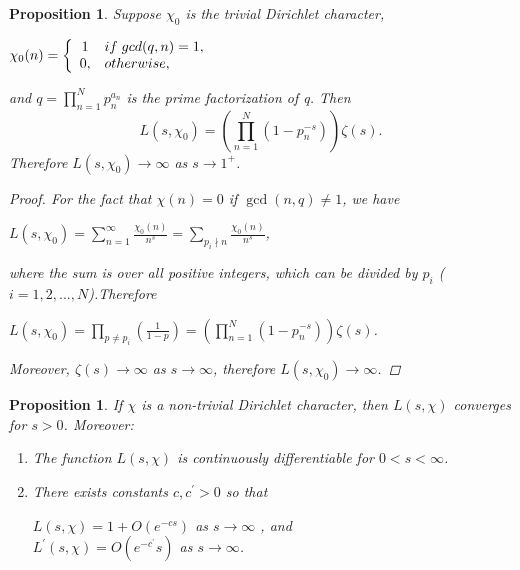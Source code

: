 \documentclass[psamsfonts]{amsart}
\newtheorem{prop}[thm]{Proposition}
\theoremstyle{definition}
\theoremstyle{remark}
\numberwithin{equation}{section}
\begin{document}
			\begin{prop}
				Suppose $\chi_0$ is the trivial Dirichlet character,
				\begin{center}
			$\chi_0(n)=\left\{\begin{array}{cl}
								1 & if \hspace{1mm} gcd(q,n) = 1,\\
								0, & otherwise,
									\end{array}\right.$
				\end{center}
				and $q = \prod_{n=1}^{N}p_n^{a_n}$ is the prime factorization of q. Then
				\begin{equation}
					L(s,\chi_0) = (\prod_{n=1}^N (1-p_n^{-s}))\zeta(s).
				\end{equation}
				Therefore $L(s,\chi_0) \rightarrow \infty$ as $s \rightarrow 1^+$.
				
				\begin{proof}
				For the fact that $\chi(n)=0$ if $\gcd(n,q) \neq 1$, we have
				\begin{center}
					$L(s,\chi_0) = \sum_{n=1}^{\infty} \frac{\chi_0(n)}{n^s} = \sum_{p_i \nmid n} \frac{\chi_0(n)}{n^s}$,
				\end{center}
					 where the sum is over all positive integers, which can be divided by $p_i$ ($i=1,2,...,N$).Therefore
					\begin{center}
						$L(s,\chi_0) = \prod_{p \neq p_i} (\frac{1}{1-p}) = (\prod_{n=1}^N (1-p_n^{-s}))\zeta(s)$.
					\end{center}
					Moreover, $\zeta(s) \rightarrow \infty$ as $s \rightarrow \infty$, therefore $L(s,\chi_0) \rightarrow \infty $.
				\end{proof}
			\end{prop}
			
			\begin{prop}
				If $\chi$ is a non-trivial Dirichlet character, then $L(s,\chi)$ converges for $s > 0$. Moreover:
				\begin{enumerate}
					\item The function $L(s,\chi)$ is continuously differentiable for $0 < s < \infty$.
					\item There exists constants $c,c^{\prime} > 0$ so that
						\begin{center}
							$L(s,\chi) = 1 + O(e^{-cs})$ \vspace{2mm} as $s \rightarrow \infty$
, and\\
							$L^{\prime}(s,\chi) = O(e^{-c^{\prime}}s)$ \vspace{2mm} as $s \rightarrow \infty$.						
						\end{center}
				\end{enumerate}
			\end{prop}
			
\end{document}
